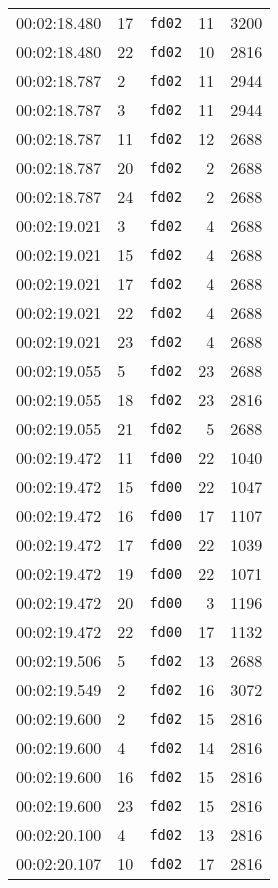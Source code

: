 \documentclass{article}
\begin{document}
\begin{longtable}{lllrr}
00:02:18.480 & 17 & \texttt{fd02} & 11 & 3200 \\
00:02:18.480 & 22 & \texttt{fd02} & 10 & 2816 \\
00:02:18.787 & 2 & \texttt{fd02} & 11 & 2944 \\
00:02:18.787 & 3 & \texttt{fd02} & 11 & 2944 \\
00:02:18.787 & 11 & \texttt{fd02} & 12 & 2688 \\
00:02:18.787 & 20 & \texttt{fd02} & 2 & 2688 \\
00:02:18.787 & 24 & \texttt{fd02} & 2 & 2688 \\
00:02:19.021 & 3 & \texttt{fd02} & 4 & 2688 \\
00:02:19.021 & 15 & \texttt{fd02} & 4 & 2688 \\
00:02:19.021 & 17 & \texttt{fd02} & 4 & 2688 \\
00:02:19.021 & 22 & \texttt{fd02} & 4 & 2688 \\
00:02:19.021 & 23 & \texttt{fd02} & 4 & 2688 \\
00:02:19.055 & 5 & \texttt{fd02} & 23 & 2688 \\
00:02:19.055 & 18 & \texttt{fd02} & 23 & 2816 \\
00:02:19.055 & 21 & \texttt{fd02} & 5 & 2688 \\
00:02:19.472 & 11 & \texttt{fd00} & 22 & 1040 \\
00:02:19.472 & 15 & \texttt{fd00} & 22 & 1047 \\
00:02:19.472 & 16 & \texttt{fd00} & 17 & 1107 \\
00:02:19.472 & 17 & \texttt{fd00} & 22 & 1039 \\
00:02:19.472 & 19 & \texttt{fd00} & 22 & 1071 \\
00:02:19.472 & 20 & \texttt{fd00} & 3 & 1196 \\
00:02:19.472 & 22 & \texttt{fd00} & 17 & 1132 \\
00:02:19.506 & 5 & \texttt{fd02} & 13 & 2688 \\
00:02:19.549 & 2 & \texttt{fd02} & 16 & 3072 \\
00:02:19.600 & 2 & \texttt{fd02} & 15 & 2816 \\
00:02:19.600 & 4 & \texttt{fd02} & 14 & 2816 \\
00:02:19.600 & 16 & \texttt{fd02} & 15 & 2816 \\
00:02:19.600 & 23 & \texttt{fd02} & 15 & 2816 \\
00:02:20.100 & 4 & \texttt{fd02} & 13 & 2816 \\
00:02:20.107 & 10 & \texttt{fd02} & 17 & 2816 \\

\end{longtable}
\end{document}
